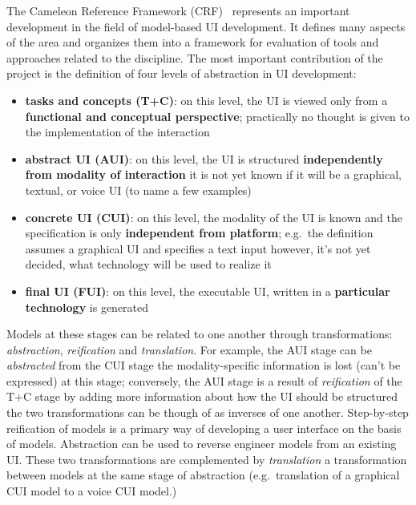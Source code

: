 The Cameleon Reference Framework (CRF)~\cite{calvary_cameleon_framework_2002, calvary_cameleon_glossary_2002} represents an important development in the field of model-based UI development.
It defines many aspects of the area and organizes them into a framework for evaluation of tools and approaches related to the discipline.
The most important contribution of the project is the definition of four levels of abstraction in UI development:
\begin{samepage}
\begin{itemize}
    \item \textbf{tasks and concepts (T+C)}: on this level, the UI is viewed only from a \textbf{functional and conceptual perspective};
    practically no thought is given to the implementation of the interaction
    \item \textbf{abstract UI (AUI)}: on this level, the UI is structured \textbf{independently from modality of interaction}\,\textendash\,it is not yet known if it will be a graphical, textual, or voice UI (to name a few examples)
    \item \textbf{concrete UI (CUI)}: on this level, the modality of the UI is known and the specification is only \textbf{independent from platform};
    e.g.\ the definition assumes a graphical UI and specifies a text input\,\textendash\,however, it's not yet decided, what technology will be used to realize it
    \item \textbf{final UI (FUI)}: on this level, the executable UI, written in a \textbf{particular technology} is generated
\end{itemize}
\end{samepage}
Models at these stages can be related to one another through transformations: \emph{abstraction}, \emph{reification} and \emph{translation}.
For example, the AUI stage can be \emph{abstracted} from the CUI stage\,\textendash\,the modality-specific information is lost (can't be expressed) at this stage;
conversely, the AUI stage is a result of  \emph{reification} of the T+C stage by adding more information about how the UI should be structured\,\textendash\,the two transformations can be though of as inverses of one another.
Step-by-step reification of models is a primary way of developing a user interface on the basis of models.
Abstraction can be used to reverse engineer models from an existing UI.
These two transformations are complemented by \emph{translation}\,\textendash\,a transformation between models at the same stage of abstraction (e.g.\ translation of a graphical CUI model to a voice CUI model.)

